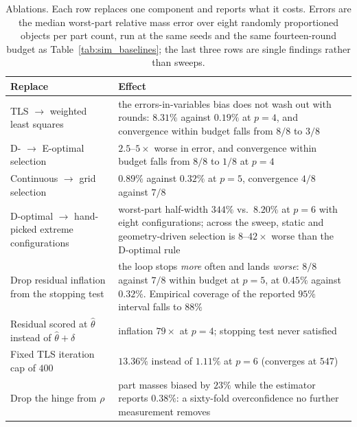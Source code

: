 \begin{table}[t]
\caption{Ablations. Each row replaces one component and reports what it costs.
Errors are the median worst-part relative mass error over eight randomly
proportioned objects per part count, run at the same seeds and the same
fourteen-round budget as Table~\ref{tab:sim_baselines}; the last three rows are
single findings rather than sweeps.}
\label{tab:ablation}
\centering
\scriptsize
\setlength{\tabcolsep}{3pt}
\begin{tabular}{p{}p{}}
\hline
Replace & Effect \\
\hline
TLS $\to$ weighted least squares
  & the errors-in-variables bias does not wash out with rounds: $8.31\%$ against
    $0.19\%$ at $p=4$, and convergence within budget falls from $8/8$ to $3/8$ \\
D- $\to$ E-optimal selection
  & $2.5$--$5\times$ worse in error, and convergence within budget falls from
    $8/8$ to $1/8$ at $p=4$ \\
Continuous $\to$ grid selection
  & $0.89\%$ against $0.32\%$ at $p=5$, convergence $4/8$ against $7/8$ \\
D-optimal $\to$ hand-picked extreme configurations
  & worst-part half-width $344\%$ vs.\ $8.20\%$ at $p=6$ with eight
    configurations; across the sweep, static and geometry-driven selection is
    $8$--$42\times$ worse than the D-optimal rule \\
Drop residual inflation from the stopping test
  & the loop stops \emph{more} often and lands \emph{worse}: $8/8$ against
    $7/8$ within budget at $p=5$, at $0.45\%$ against $0.32\%$. Empirical
    coverage of the reported $95\%$ interval falls to $88\%$ \\
Residual scored at $\hat\theta$ instead of $\hat\theta+\delta$
  & inflation $79\times$ at $p=4$; stopping test never satisfied \\
Fixed TLS iteration cap of $400$
  & $13.36\%$ instead of $1.11\%$ at $p=6$ (converges at $547$) \\
Drop the hinge from $\rho$
  & part masses biased by $23\%$ while the estimator reports $0.38\%$: a
    sixty-fold overconfidence no further measurement removes \\
\hline
\end{tabular}
\end{table}